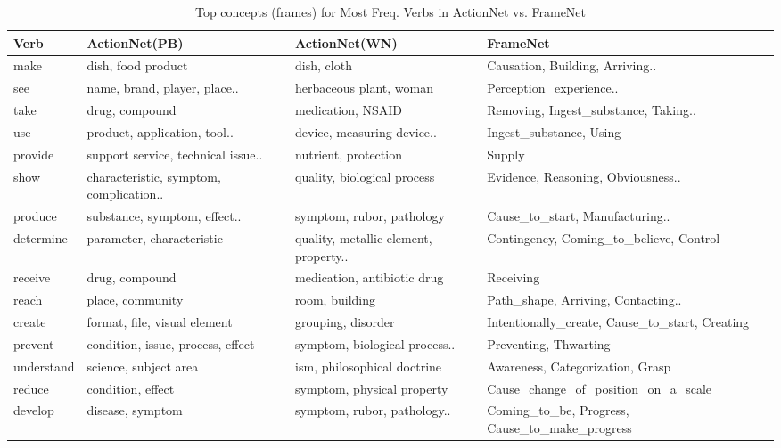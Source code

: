 \begin{table*}[th]
\centering
\scriptsize
\caption{Top concepts (frames) for Most Freq. Verbs in ActionNet vs. FrameNet}
\begin{tabular}{|l|l|l|l|} \hline
Verb & ActionNet(PB) & ActionNet(WN) & FrameNet \\
\hline\hline
make&dish, food product&dish, cloth&Causation, Building, Arriving..\\ \hline
see&name, brand, player, place.. &herbaceous plant, woman&Perception\_experience..\\ \hline
take&drug, compound&medication, NSAID&Removing, Ingest\_substance, Taking..\\ \hline
use&product, application, tool..&device, measuring device..&Ingest\_substance, Using\\ \hline
provide&support service, technical issue..&nutrient, protection&Supply\\ \hline
show&characteristic, symptom, complication..&quality, biological process&Evidence, Reasoning, Obviousness..\\ \hline
produce&substance, symptom, effect..&symptom, rubor, pathology&Cause\_to\_start, Manufacturing..\\ \hline
determine&parameter, characteristic&quality, metallic element, property..&Contingency, Coming\_to\_believe, Control\\ \hline
receive&drug, compound&medication, antibiotic drug&Receiving\\ \hline
reach&place, community&room, building&Path\_shape, Arriving, Contacting..\\ \hline
create&format, file, visual element&grouping, disorder&Intentionally\_create, Cause\_to\_start, Creating\\ \hline
prevent&condition, issue, process, effect&symptom, biological process.. &Preventing, Thwarting\\ \hline
understand&science, subject area&ism, philosophical doctrine&Awareness, Categorization, Grasp\\ \hline
reduce&condition, effect&symptom, physical property&Cause\_change\_of\_position\_on\_a\_scale\\ \hline
develop&disease, symptom&symptom, rubor, pathology..&Coming\_to\_be, Progress, Cause\_to\_make\_progress\\ \hline

\end{tabular}
\end{table*}
